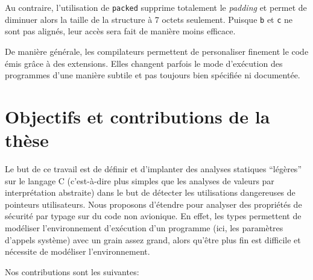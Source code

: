 Au contraire, l'utilisation de \texttt{packed} supprime totalement le
\emph{padding} et permet de diminuer alors la taille de la structure à 7 octets
seulement. Puisque \texttt{b} et \texttt{c} ne sont pas alignés, leur accès sera
fait de manière moins efficace.

De manière générale, les compilateurs permettent de personaliser finement le
code émis grâce à des extensions. Elles changent parfois le mode d'exécution des
programmes d'une manière subtile et pas toujours bien spécifiée ni documentée.

\section{Objectifs et contributions de la thèse}

Le but de ce travail est de définir et d'implanter des analyses statiques
\enquote{légères} sur le langage C (c'est-à-dire plus simples que les analyses
de valeurs par interprétation abstraite) dans le but de détecter les
utilisations dangereuses de pointeurs utilisateurs. Nous proposons d'étendre
\newspeak pour analyser des propriétés de sécurité par typage sur du code non
avionique. En effet, les types permettent de modéliser l'environnement
d'exécution d'un programme (ici, les paramètres d'appels système) avec un grain
assez grand, alors qu'être plus fin est difficile et nécessite de modéliser
l'environnement.

Nos contributions sont les suivantes:


